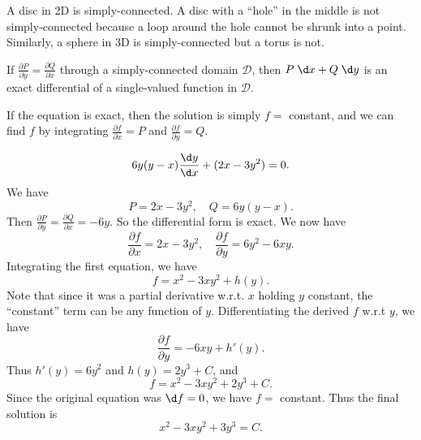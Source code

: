 \documentclass[a4paper]{article}
\begin{document}
\begin{eg}
  A disc in 2D is simply-connected. A disc with a ``hole'' in the middle is not simply-connected because a loop around the hole cannot be shrunk into a point. Similarly, a sphere in 3D is simply-connected but a torus is not.
\end{eg}

\begin{thm}
  If $\frac{\partial P}{\partial y} = \frac{\partial Q}{\partial x}$ through a simply-connected domain $\mathcal{D}$, then $P\;\d x + Q\; \d y$ is an exact differential of a single-valued function in $\mathcal{D}$.
\end{thm}
If the equation is exact, then the solution is simply $f = $ constant, and we can find $f$ by integrating $\frac{\partial f}{\partial x} = P$ and $\frac{\partial f}{\partial y} = Q$.

\begin{eg}
  \[
    6y(y - x)\frac{\d y}{\d x} + (2x - 3y^2) = 0.
  \]
  We have
  \[
    P = 2x - 3y^2, \quad Q = 6y(y - x).
  \]
  Then $\frac{\partial P}{\partial y} = \frac{\partial Q}{\partial x} = -6y$. So the differential form is exact. We now have
  \[
    \frac{\partial f}{\partial x} = 2x - 3y^2, \quad \frac{\partial f}{\partial y} = 6y^2 - 6xy.
  \]
  Integrating the first equation, we have
  \[
    f = x^2 - 3xy^2 + h(y).
  \]
  Note that since it was a partial derivative w.r.t. $x$ holding $y$ constant, the ``constant'' term can be any function of $y$. Differentiating the derived $f$ w.r.t $y$, we have
  \[
    \frac{\partial f}{\partial y} = -6xy + h'(y).
  \]
  Thus $h'(y) = 6y^2$ and $h(y) = 2y^3 + C$, and
  \[
    f = x^2 - 3xy^2 + 2y^3 + C.
  \]
  Since the original equation was $\d f = 0$, we have $f = $ constant. Thus the final solution is
  \[
    x^2 - 3xy^2 + 3y^3 = C.
  \]
\end{eg}
\end{document}
